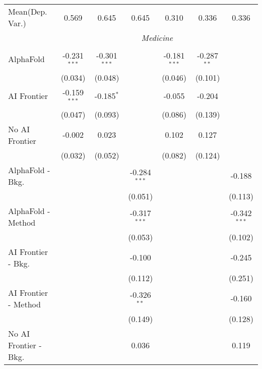 \begin{tabular}{lcccccc}
Mean(Dep. Var.) & 0.569 & 0.645 & 0.645 & 0.310 & 0.336 & 0.336 \\
 & \multicolumn{6}{c}{\textit{Medicine}} \\ \\
   AlphaFold               & -0.231$^{***}$ & -0.301$^{***}$ &                & -0.181$^{***}$ & -0.287$^{**}$ &   \\   
                           & (0.034)        & (0.048)        &                & (0.046)        & (0.101)       &   \\   
   AI Frontier             & -0.159$^{***}$ & -0.185$^{*}$   &                & -0.055         & -0.204        &   \\   
                           & (0.047)        & (0.093)        &                & (0.086)        & (0.139)       &   \\   
   No AI Frontier          & -0.002         & 0.023          &                & 0.102          & 0.127         &   \\   
                           & (0.032)        & (0.052)        &                & (0.082)        & (0.124)       &   \\   
   AlphaFold - Bkg.        &                &                & -0.284$^{***}$ &                &               & -0.188\\   
                           &                &                & (0.051)        &                &               & (0.113)\\   
   AlphaFold - Method      &                &                & -0.317$^{***}$ &                &               & -0.342$^{***}$\\   
                           &                &                & (0.053)        &                &               & (0.102)\\   
   AI Frontier - Bkg.      &                &                & -0.100         &                &               & -0.245\\   
                           &                &                & (0.112)        &                &               & (0.251)\\   
   AI Frontier - Method    &                &                & -0.326$^{**}$  &                &               & -0.160\\   
                           &                &                & (0.149)        &                &               & (0.128)\\   
   No AI Frontier - Bkg.   &                &                & 0.036          &                &               & 0.119\\   

\end{tabular}

